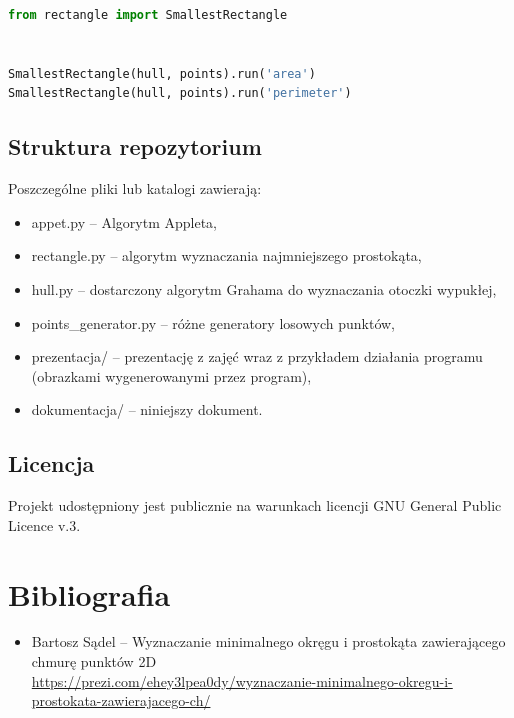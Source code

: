 \documentclass[hidelinks]{article}
\begin{document}
\begin{lstlisting}[language=python,frame=single,linewidth=1\textwidth]
from rectangle import SmallestRectangle


SmallestRectangle(hull, points).run('area')
SmallestRectangle(hull, points).run('perimeter')
\end{lstlisting}

\newpage

\subsection{Struktura repozytorium}

Poszczególne pliki lub katalogi zawierają:
\begin{itemize}
\item appet.py – Algorytm Appleta,
\item rectangle.py – algorytm wyznaczania najmniejszego prostokąta,
\item hull.py – dostarczony algorytm Grahama do wyznaczania otoczki wypukłej,
\item points\_generator.py – różne generatory losowych punktów,
\item prezentacja/ – prezentację z zajęć wraz z przykładem działania programu (obrazkami wygenerowanymi przez program),
\item dokumentacja/ – niniejszy dokument.
\end{itemize}

\subsection{Licencja}
Projekt udostępniony jest publicznie na warunkach licencji GNU General Public
Licence v.3.

\section{Bibliografia}
\begin{itemize}
\item Bartosz Sądel – Wyznaczanie minimalnego okręgu i prostokąta zawierającego chmurę punktów 2D \\
\url{https://prezi.com/ehey3lpea0dy/wyznaczanie-minimalnego-okregu-i-prostokata-zawierajacego-ch/}

\end{itemize}
\end{document}
